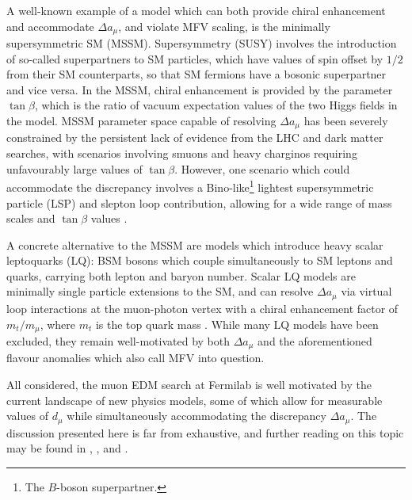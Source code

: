 A well-known example of a model which can both provide chiral enhancement and accommodate $\Delta a_{\mu}$, and violate MFV scaling, is the minimally supersymmetric SM (MSSM). Supersymmetry (SUSY) involves the introduction of so-called superpartners to SM particles, which have values of spin offset by $1/2$ from their SM counterparts, so that SM fermions have a bosonic superpartner and vice versa. In the MSSM, chiral enhancement is provided by the parameter $\tan\beta$, which is the ratio of vacuum expectation values of the two Higgs fields in the model. MSSM parameter space capable of resolving $\Delta a_{\mu}$ has been severely constrained by the persistent lack of evidence from the LHC and dark matter searches, with scenarios involving smuons and heavy charginos requiring unfavourably large values of $\tan\beta$. However, one scenario which could accommodate the discrepancy involves a Bino-like\footnote{The $B$-boson superpartner.} lightest supersymmetric particle (LSP) and slepton loop contribution, allowing for a wide range of mass scales and $\tan \beta$ values \cite{NewPhysicsExplanations2021}. 

A concrete alternative to the MSSM are models which introduce heavy scalar leptoquarks (LQ): BSM bosons which couple simultaneously to SM leptons and quarks, carrying both lepton and baryon number. Scalar LQ models are minimally single particle extensions to the SM, and can resolve $\Delta a_{\mu}$ via virtual loop interactions at the muon-photon vertex with a chiral enhancement factor of $m_{t}/m_{\mu}$, where $m_{t}$ is the top quark mass \cite{NewPhysicsExplanations2021}. While many LQ models have been excluded, they remain well-motivated by both $\Delta a_{\mu}$ and the aforementioned flavour anomalies which also call MFV into question.

All considered, the muon EDM search at Fermilab is well motivated by the current landscape of new physics models, some of which allow for measurable values of $d_{\mu}$ while simultaneously accommodating the discrepancy $\Delta a_{\mu}$. The discussion presented here is far from exhaustive, and further reading on this topic may be found in \cite{CombinedExplantionsForaMuAndEDM2018}, \cite{CombinedExplantionsForaMuAndEDM2020}, and \cite{NewPhysicsExplanations2021}.